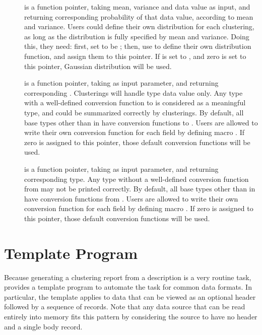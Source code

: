 \begin{description}
\item[] is a function pointer, taking mean,
  variance and data value as input, and returning corresponding
  probability of that data value, according to mean and variance. Users
  could define their own distribution for each clustering, as long as the
  distribution is fully specified by mean and variance. Doing this,
  they need: first, set  to be ; then, use
   to define their own distribution function, and
  assign them to this pointer. If  is set to ,
  and zero is set to this pointer, Gaussian distribution will be used.

\item[] is a function pointer, taking
   as input parameter, and returning corresponding
  . Clusterings will handle  type data value 
  only. Any type with a well-defined conversion function to
   is considered as a meaningful type, and could be summarized
  correctly by clusterings. By default, all base types other than  in \pads{} have
  conversion functions to . Users are allowed to write their
  own conversion function for each field by defining macro . If zero is assigned to this pointer, those default
  conversion functions will be used.
   
\item[] is a function pointer, taking
   as input parameter, and returning corresponding
   type. Any type without a well-defined conversion
  function from  may not be printed correctly. By
  default, all base types other than  in \pads{} have
  conversion functions from . Users are allowed to write their
  own conversion function for each field by defining macro . If zero is assigned to this pointer, those default
  conversion functions will be used.

\end{description}

\section{Template Program}
Because generating a clustering report from a \pads{} description is a
very routine task, \pads{} provides a template program to automate the
task for common data formats. In particular, the template applies to
data that can be viewed as an optional header followed by a sequence
of records. Note that any data source that can be read entirely into
memory fits this pattern by considering the source to have no header
and a single body record. 

